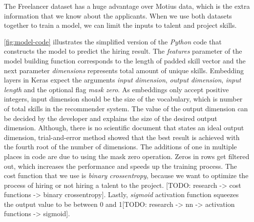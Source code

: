 The Freelancer dataset has a huge advantage over Motius data, which is the extra information that we know about the applicants. When we use both datasets together to train a model, we can limit the inputs to talent and project skills. 

\autoref{fig:model-code} illustrates the simplified version of the \textit{Python} code that constructs the model to predict the hiring result. The \textit{features} parameter of the model building function corresponds to the length of padded skill vector and the next parameter \textit{dimensions} represents total amount of unique skills. Embedding layers in Keras expect the arguments \textit{input dimension}, \textit{output dimension}, \textit{input length} and the optional flag \textit{mask zero}. As embeddings only accept positive integers, input dimension should be the size of the vocabulary, which is number of total skills in the recommender system. The value of the output dimension can be decided by the developer and explains the size of the desired output dimension. Although, there is no scientific document that states an ideal output dimension, trial-and-error method showed that the best result is achieved with the fourth root of the number of dimensions. The additions of one in multiple places in code are due to using the mask zero operation. Zeros in rows get filtered out, which increases the performance and speeds up the training process. The cost function that we use is \textit{binary crossentropy}, because we want to optimize the process of hiring or not hiring a talent to the project. [TODO: research -> cost functions -> binary crossentropy]. Lastly, \textit{sigmoid} activation function squeezes the output value to be between 0 and 1[TODO: research -> nn -> activation functions -> sigmoid].



